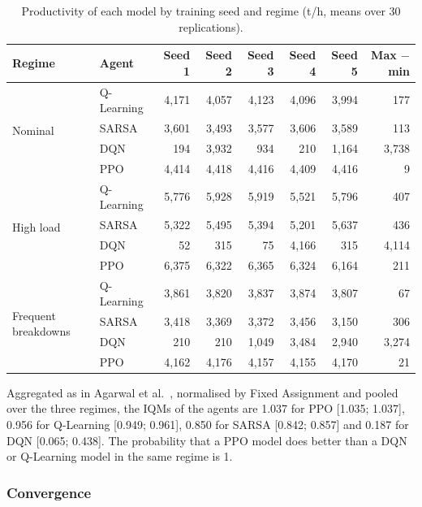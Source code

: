 \documentclass[11pt,a4paper]{article}
\newif\ifrevmarks
\newcommand{\revtag}[1]{\ifrevmarks\textsuperscript{\textcolor{red!70!black}{\scriptsize[#1]}}\fi}
\newenvironment{revbloc}[1]{\par\ifrevmarks\color{revcolor}\noindent\revtag{#1}\ \fi}{\par}
\begin{document}
\begin{revbloc}{T31}
\begin{table}[H]
\centering
\caption{Productivity of each model by training seed and regime (t/h, means over 30 replications).}
\label{tab:runs}
\small
\setlength{\tabcolsep}{4pt}
\begin{tabular}{@{}llrrrrrr@{}}
\toprule
\textbf{Regime} & \textbf{Agent} & \textbf{Seed 1} & \textbf{Seed 2} & \textbf{Seed 3} & \textbf{Seed 4} & \textbf{Seed 5} & \textbf{Max $-$ min} \\
\midrule
\multirow{4}{*}{Nominal} & Q-Learning & 4{,}171 & 4{,}057 & 4{,}123 & 4{,}096 & 3{,}994 & 177 \\
 & SARSA & 3{,}601 & 3{,}493 & 3{,}577 & 3{,}606 & 3{,}589 & 113 \\
 & DQN & 194 & 3{,}932 & 934 & 210 & 1{,}164 & 3{,}738 \\
 & PPO & 4{,}414 & 4{,}418 & 4{,}416 & 4{,}409 & 4{,}416 & 9 \\
\midrule
\multirow{4}{*}{High load} & Q-Learning & 5{,}776 & 5{,}928 & 5{,}919 & 5{,}521 & 5{,}796 & 407 \\
 & SARSA & 5{,}322 & 5{,}495 & 5{,}394 & 5{,}201 & 5{,}637 & 436 \\
 & DQN & 52 & 315 & 75 & 4{,}166 & 315 & 4{,}114 \\
 & PPO & 6{,}375 & 6{,}322 & 6{,}365 & 6{,}324 & 6{,}164 & 211 \\
\midrule
\multirow{4}{*}{Frequent breakdowns} & Q-Learning & 3{,}861 & 3{,}820 & 3{,}837 & 3{,}874 & 3{,}807 & 67 \\
 & SARSA & 3{,}418 & 3{,}369 & 3{,}372 & 3{,}456 & 3{,}150 & 306 \\
 & DQN & 210 & 210 & 1{,}049 & 3{,}484 & 2{,}940 & 3{,}274 \\
 & PPO & 4{,}162 & 4{,}176 & 4{,}157 & 4{,}155 & 4{,}170 & 21 \\
\bottomrule
\end{tabular}
\end{table}

Aggregated as in Agarwal et al.~\cite{Agarwal2021}, normalised by Fixed Assignment and pooled over the three regimes, the IQMs of the agents are 1.037 for PPO [1.035; 1.037], 0.956 for Q-Learning [0.949; 0.961], 0.850 for SARSA [0.842; 0.857] and 0.187 for DQN [0.065; 0.438]. The probability that a PPO model does better than a DQN or Q-Learning model in the same regime is 1.
\end{revbloc}

\subsubsection{Convergence}
\label{sec:convergence}
\end{document}

